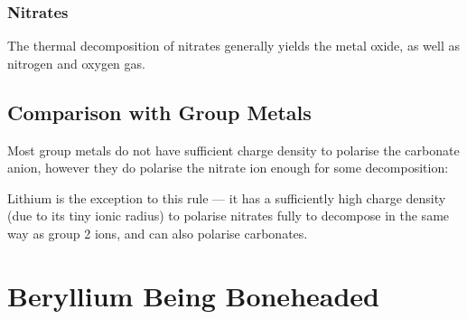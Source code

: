 



			\subsubsection{Nitrates}

				The thermal decomposition of nitrates generally yields the metal oxide, as well as nitrogen
				and oxygen gas.





		\subsection{Comparison with Group  Metals}

			Most group  metals do not have sufficient charge density to polarise the
			carbonate anion, however they do polarise the nitrate ion enough for some decomposition:


			Lithium is the exception to this rule --- it has a sufficiently high charge density (due to its
			tiny ionic radius) to polarise nitrates fully to decompose in the same way as group 2 ions, and
			can also polarise carbonates.





	\section{Beryllium Being Boneheaded}

